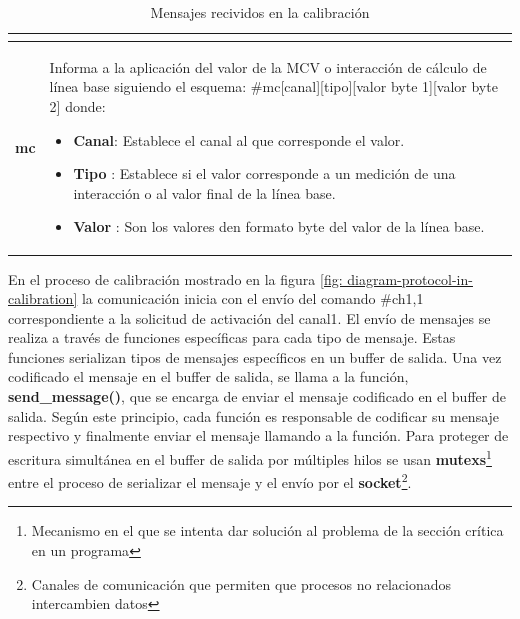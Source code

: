 \begin{table}[ht]
\begin{tabular}{ |c|p{14cm}|}
\begin{minipage}{14cm}
\begin{itemize}
                                \end{itemize}
                                \vspace{1pt}
                            \end{minipage}\\\hline 
        \textbf{mc}     &   \begin{minipage}{14cm}
                                \vspace{1pt}
                                Informa a la aplicación del valor de la MCV o interacción de cálculo de línea base siguiendo el esquema: \#mc[canal][tipo][valor byte 1][valor byte 2] donde:
                                \begin{itemize}
                                    \item \textbf{Canal}: Establece el canal al que corresponde el valor.
                                    \item \textbf{Tipo} : Establece si el valor corresponde a un medición de una interacción o al valor final de la línea base.
                                    \item \textbf{Valor} : Son los valores den formato byte del valor de la línea base.  
                                \end{itemize}
                                \vspace{1pt}
                            \end{minipage} \\\hline                        
    \end{tabular}
    \caption{Mensajes recividos en la calibración}
    \label{table:recive-msg-in-calibration}
\end{table} 


\newpage
{}
En el proceso de calibración mostrado en la figura \ref{fig: diagram-protocol-in-calibration}  la comunicación inicia con el envío del comando \#ch1,1 correspondiente a la solicitud de activación  del canal1. El envío de mensajes se realiza  a través de funciones específicas para cada tipo de mensaje. Estas funciones serializan tipos de mensajes específicos en un buffer de salida. Una vez codificado el mensaje en el buffer de salida, se llama a la función, \textbf{send\_message()}, que se encarga de enviar el mensaje codificado en el buffer de salida. Según este principio, cada función es responsable de codificar su mensaje respectivo y finalmente enviar el mensaje llamando a la función. Para proteger de escritura simultánea en el buffer de salida por múltiples hilos se usan \textbf{mutexs}\footnote{Mecanismo en el que se intenta dar solución al problema de la sección crítica en un programa} entre el
proceso de serializar el mensaje y el envío por el {\textbf{socket}}\footnote{Canales de comunicación que permiten que procesos no relacionados intercambien datos}. 
    
